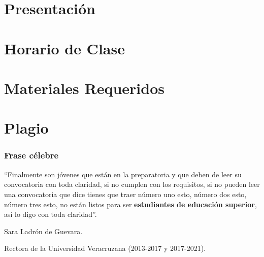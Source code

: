 \documentclass[aspectratio=169]{beamer}
\title{\nombreMateria} %
\author{Dr. Marco Aurelio Nuño Maganda} %
\institute[UPV] %
{
Universidad Politecnica de Victoria \\ %
\programaAcademico \\ %
\cuatrimestre  \\ %
\medskip
\textit{mnunom@upv.edu.mx} %
}
\date{\today} %
\begin{document}
\begin{frame}
\titlepage %
\end{frame}




\section{Presentación} 


\section{Horario de Clase}









%




%

%




\section{Materiales Requeridos}
%




\section{Plagio}




\begin{frame}
\frametitle{Frase célebre}
``Finalmente son jóvenes que están en la preparatoria y que deben de leer su convocatoria con toda claridad, si no cumplen con los requisitos, si no pueden leer una convocatoria que dice tienes que traer número uno esto, número dos esto, número tres esto, no están listos para ser \textbf{estudiantes de educación superior}, así lo digo con toda claridad''.

Sara Ladrón de Guevara.

Rectora de la Universidad Veracruzana (2013-2017 y 2017-2021).

\end{frame}





\end{document}
